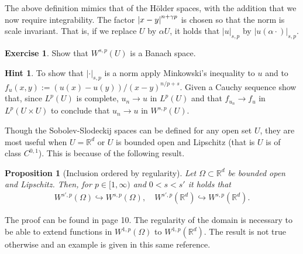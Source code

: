 \documentclass[
    a4paper,
    DIV=14,
    abstract=true,
    numbers=noenddot
]
{scrartcl}
\newtheorem{proposition}[theorem]{Proposition}
\theoremstyle{definition}
\newtheorem{exercise}{Exercise}
\newtheorem*{hint}{Hint}
\newcommand{\R}{\mathbb{R}}
\begin{document}
The above definition mimics that of the H\"older spaces, with the addition that we now require integrability. The factor $\left| x-y \right|^{n+\gamma p}$ is chosen so that the norm is scale invariant. That is, if we replace $U$ by $\alpha U$, it holds that $|u|_{s,p}$ by $|u(\alpha \cdot )|_{s,p}$.
\begin{exercise}
	Show that $W^{s,p}(U)$ is a Banach space.
\end{exercise}
\begin{hint}
	To show that $| \cdot |_{s,p}$ is a norm apply Minkowski's inequality to $u$ and to $f_u(x,y):=(u(x)-u(y))/(x-y)^{n/p+s}$. Given a Cauchy sequence show that, since $L^p(U)$ is complete, $u_n \to u$ in $L^p(U)$ and that $f_{u_n} \to f_u$ in $L^p(U\times U)$ to conclude that $u_n \to u$ in $W^{s,p}(U)$.
\end{hint}
Though the Sobolev-Slodeckij spaces can be defined for any open set $U$, they are most useful when $U=\R^d$ or $U$  is bounded open and Lipschitz (that is $U$ is of class $C^{0,1}$). This is because of the following result.
\begin{proposition}[Inclusion ordered by regularity]
	Let  $\Omega \subset \R^d$ be bounded open and Lipschitz. Then, for $p \in [1,\infty)$ and $0<s<s'$ it holds that
	\begin{align*}
		W^{s',p}(\Omega )\hookrightarrow W^{s,p}(\Omega ), \quad W^{s',p}(\R^d)\hookrightarrow W^{s,p}(\R^d).
	\end{align*}
\end{proposition}
The proof can be found in \cite{di2012hitchhiker's} page 10. The regularity of the domain is necessary to be able to extend functions in $W^{1,p}(\Omega )$ to $W^{1,p}(\R^d)$. The result is not true otherwise and an example is given in this same reference.
\end{document}
